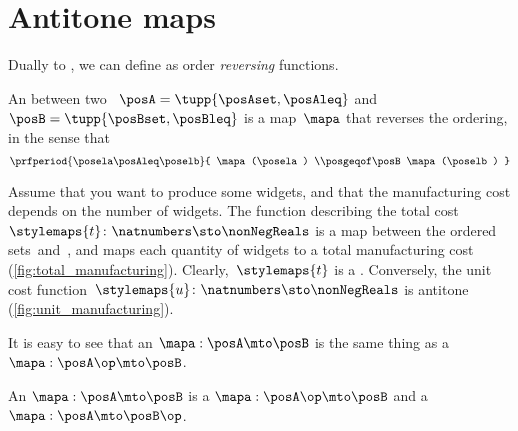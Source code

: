 \section{Antitone maps}

Dually to  , we can define  as order \emph{reversing} functions.

\begin{definition}
    \label{def:antitone}
    An  between two ~$\posA=\tupp{\posAset, \posAleq}$ and~$\posB=\tupp{\posBset, \posBleq}$ is a map~$\mapa$ that reverses the ordering, in the sense that
    \begin{equation}
        \prfperiod{
            \posela \posAleq \poselb
        }{
            \mapa(\posela) \\posgeqof\posB \mapa(\poselb)
        }
    \end{equation}
\end{definition}

\begin{example}
    Assume that you want to produce some widgets, and that the manufacturing cost depends on the number of widgets.
    The function describing the total cost~$\stylemaps{t}\colon \natnumbers \sto \nonNegReals$ is a map between the ordered sets~\natnumbers and~\nonNegReals, and maps each quantity of widgets to a total manufacturing cost (\cref{fig:total_manufacturing}).
    Clearly,~$\stylemaps{t}$ is a .
    Conversely, the unit cost function~$\stylemaps{u}\colon \natnumbers \sto \nonNegReals$ is antitone (\cref{fig:unit_manufacturing}).
\end{example}

\begin{figure}[h!]
\end{figure}

It is easy to see that an  $\mapa: \posA \mto \posB$ is the same thing as a  $\mapa: \posA\op \mto \posB$.

\begin{lemma}\label{lem:antitone-is-monotone}
    An   $\mapa: \posA \mto \posB$ is a  $\mapa: \posA\op \mto \posB$
    and a  $\mapa: \posA \mto \posB\op$.
\end{lemma}
